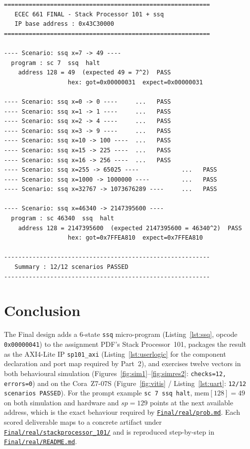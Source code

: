 \documentclass[11pt,letterpaper]{article}
\begin{document}
\begin{lstlisting}[language={},caption={Captured UART trace (verbatim
from the Cora~Z7-07S run; abbreviated -- full text in
Fig.~\ref{fig:vitis}).},label={lst:uart}]
==========================================================
   ECEC 661 FINAL - Stack Processor 101 + ssq
   IP base address : 0x43C30000
==========================================================

---- Scenario: ssq x=7 -> 49 ----
  program : sc 7  ssq  halt
    address 128 = 49  (expected 49 = 7^2)  PASS
                  hex: got=0x00000031  expect=0x00000031

---- Scenario: ssq x=0 -> 0 ----     ...   PASS
---- Scenario: ssq x=1 -> 1 ----     ...   PASS
---- Scenario: ssq x=2 -> 4 ----     ...   PASS
---- Scenario: ssq x=3 -> 9 ----     ...   PASS
---- Scenario: ssq x=10 -> 100 ----  ...   PASS
---- Scenario: ssq x=15 -> 225 ----  ...   PASS
---- Scenario: ssq x=16 -> 256 ----  ...   PASS
---- Scenario: ssq x=255 -> 65025 ----            ...   PASS
---- Scenario: ssq x=1000 -> 1000000 ----         ...   PASS
---- Scenario: ssq x=32767 -> 1073676289 ----     ...   PASS

---- Scenario: ssq x=46340 -> 2147395600 ----
  program : sc 46340  ssq  halt
    address 128 = 2147395600  (expected 2147395600 = 46340^2)  PASS
                  hex: got=0x7FFEA810  expect=0x7FFEA810

----------------------------------------------------------
   Summary : 12/12 scenarios PASSED
----------------------------------------------------------
\end{lstlisting}

\section{Conclusion}

The Final design adds a 6-state \texttt{ssq} micro-program
(Listing~\ref{lst:ssq}, opcode \texttt{0x00000041}) to the assignment
PDF's Stack Processor~101, packages the result as the AXI4-Lite IP
\texttt{sp101\_axi} (Listing~\ref{lst:userlogic} for the component
declaration and port map required by Part~2), and exercises twelve
vectors in both behavioural simulation
(Figures~\ref{fig:sim1}--\ref{fig:simres2}: \texttt{checks=12,
errors=0}) and on the Cora~Z7-07S
(Figure~\ref{fig:vitis} / Listing~\ref{lst:uart}:
\texttt{12/12 scenarios PASSED}).  For the prompt example
\texttt{sc 7 ssq halt}, \(\mathrm{mem}[128]=49\) on both simulation and
hardware and \(\mathit{sp}=129\) points at the next available address,
which is the exact behaviour required by
\href{run:../prob.md}{\texttt{Final/real/prob.md}}.  Each scored
deliverable maps to a concrete artifact under
\href{run:../stackprocessor_101/}{\texttt{Final/real/stackprocessor\_101/}}
and is reproduced step-by-step in
\href{run:../README.md}{\texttt{Final/real/README.md}}.
\end{document}
